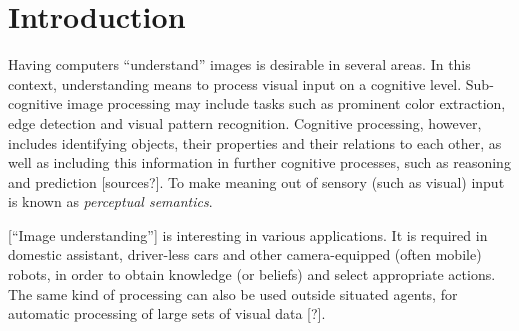 \documentclass[11pt, a4paper]{article}
\begin{document}

\thispagestyle{empty}




\newpage

\begin{spacing}{0.0}
\glsresetall
\tableofcontents
\end{spacing}

\thispagestyle{empty}

\newpage
\setcounter{page}{1}

\glsresetall
\section{Introduction}
\label{sec:intro}

Having computers ``understand'' images is desirable in several areas.
In this context, understanding means to process visual input on a cognitive level.
Sub-cognitive image processing may include tasks such as prominent color extraction, edge detection and visual pattern recognition.
Cognitive processing, however, includes identifying objects, their properties and their relations to each other, as well as including this information in further cognitive processes, such as reasoning and prediction [sources?].
To make meaning out of sensory (such as visual) input is known as \textit{perceptual semantics}.

[``Image understanding''] is interesting in various applications.
It is required in domestic assistant, driver-less cars and other camera-equipped (often mobile) robots, in order to obtain knowledge (or beliefs) and select appropriate actions.
The same kind of processing can also be used outside situated agents, for automatic processing of large sets of visual data [?].
\end{document}
